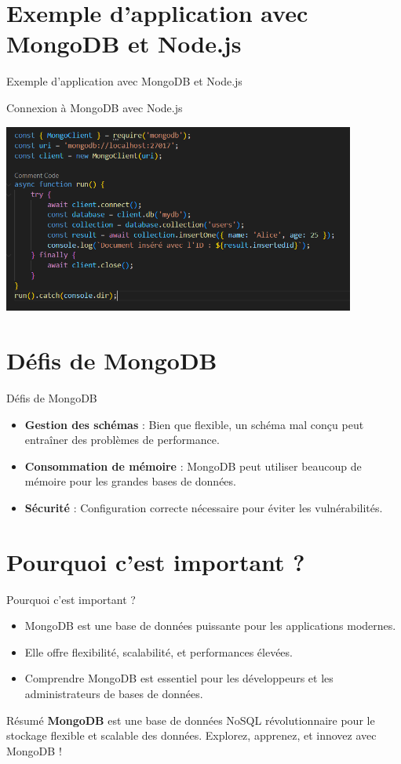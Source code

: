 \documentclass{clbeamer2024}
\begin{document}
	
	\section{Exemple d'application avec MongoDB et Node.js}
	\begin{frame}{Exemple d'application avec MongoDB et Node.js}
		\begin{exampleblock}{Connexion à MongoDB avec Node.js}
			\begin{center}
			\includegraphics[width=0.87\textwidth]{images/code1.png}
		\end{center}
		\end{exampleblock}
	\end{frame}
	
	
	\section{Défis de MongoDB}
	\begin{frame}{Défis de MongoDB}
		\begin{itemize}
			\item \textbf{Gestion des schémas} : Bien que flexible, un schéma mal conçu peut entraîner des problèmes de performance.
			\item \textbf{Consommation de mémoire} : MongoDB peut utiliser beaucoup de mémoire pour les grandes bases de données.
			\item \textbf{Sécurité} : Configuration correcte nécessaire pour éviter les vulnérabilités.
		\end{itemize}
	\end{frame}
	
	
	\section{Pourquoi c'est important ?}
	\begin{frame}{Pourquoi c'est important ?}
		\begin{itemize}
			\item MongoDB est une base de données puissante pour les applications modernes.
			\item Elle offre flexibilité, scalabilité, et performances élevées.
			\item Comprendre MongoDB est essentiel pour les développeurs et les administrateurs de bases de données.
		\end{itemize}
	\end{frame}
	
	
	\begin{frame}{Résumé}
		\textbf{MongoDB} est une base de données NoSQL révolutionnaire pour le stockage flexible et scalable des données.  
		Explorez, apprenez, et innovez avec MongoDB !
	\end{frame}
	
\end{document}
